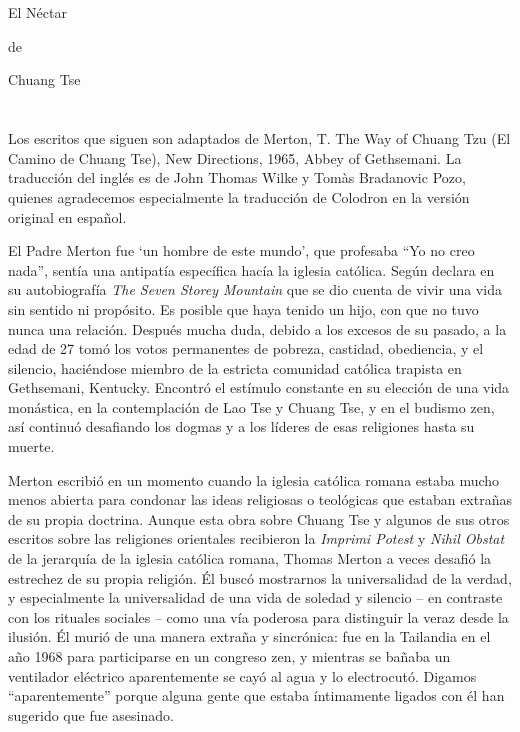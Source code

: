\documentclass[book,b5paper,hidelinks,final]{memoir}
\begin{document}
	\chapter*{}

	El Néctar
	
	de
	
	Chuang Tse
	
	\chapter*{}
	
	Los escritos que siguen son adaptados de Merton, T. The Way of Chuang
	Tzu (El Camino de Chuang Tse), New Directions, 1965, Abbey of
	Gethsemani. La traducción del inglés es de John Thomas Wilke y Tomàs
	Bradanovic Pozo, quienes agradecemos especialmente la traducción de
	Colodron en la versión original en español.
	
	El Padre Merton fue `un hombre de este mundo', que profesaba ``Yo no
	creo nada'', sentía una antipatía específica hacía la iglesia católica.
	Según declara en su autobiografía \textit{The Seven Storey Mountain} que
	se dio cuenta de vivir una vida sin sentido ni propósito. Es posible que
	haya tenido un hijo, con que no tuvo nunca una relación. Después mucha
	duda, debido a los excesos de su pasado, a la edad de 27 tomó los votos
	permanentes de pobreza, castidad, obediencia, y el silencio, haciéndose
	miembro de la estricta comunidad católica trapista en Gethsemani,
	Kentucky. Encontró el estímulo constante en su elección de una vida
	monástica, en la contemplación de Lao Tse y Chuang Tse, y en el budismo
	zen, así continuó desafiando los dogmas y a los líderes de esas
	religiones hasta su muerte.
	
	Merton escribió en un momento cuando la iglesia católica romana estaba
	mucho menos abierta para condonar las ideas religiosas o teológicas que
	estaban extrañas de su propia doctrina. Aunque esta obra sobre Chuang
	Tse y algunos de sus otros escritos sobre las religiones orientales
	recibieron la \textit{Imprimi Potest} y \textit{Nihil Obstat} de la
	jerarquía de la iglesia católica romana, Thomas Merton a veces desafió
	la estrechez de su propia religión. Él buscó mostrarnos la universalidad
	de la verdad, y especialmente la universalidad de una vida de soledad y
	silencio -- en contraste con los rituales sociales -- como una vía
	poderosa para distinguir la veraz desde la ilusión. Él murió de una
	manera extraña y sincrónica: fue en la Tailandia en el año 1968 para
	participarse en un congreso zen, y mientras se bañaba un ventilador
	eléctrico aparentemente se cayó al agua y lo electrocutó. Digamos
	``aparentemente'' porque alguna gente que estaba íntimamente ligados con
	él han sugerido que fue asesinado.
	
\end{document}
